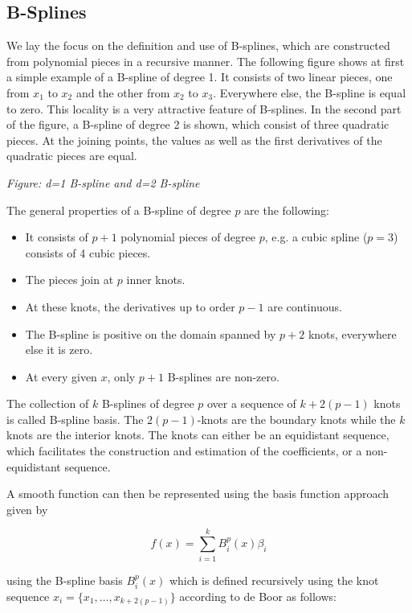 \documentclass[10pt,a4paper]{article}
\begin{document}
\subsection{B-Splines}

We lay the focus on the definition and use of B-splines, which are constructed from polynomial pieces in a recursive manner. The following figure shows at first a simple example of a B-spline of degree 1. It consists of two linear pieces, one from $x_1$ to $x_2$ and the other from $x_2$ to $x_3$. Everywhere else, the B-spline is equal to zero. This locality is a very attractive feature of B-splines. In the second part of the figure, a B-spline of degree 2 is shown, which consist of three quadratic pieces. At the joining points, the values as well as the first derivatives of the quadratic pieces are equal. 

\emph{Figure: d=1 B-spline and d=2 B-spline}

The general properties of a B-spline of degree $p$ are the following:

\begin{itemize}
	\item It consists of $p+1$ polynomial pieces of degree $p$, e.g. a cubic spline ($p=3$) consists of 4 cubic pieces.
	\item The pieces join at $p$ inner knots.
	\item At these knots, the derivatives up to order $p-1$ are continuous.
	\item The B-spline is positive on the domain spanned by $p+2$ knots, everywhere else it is zero.
	\item At every given $x$, only $p+1$ B-splines are non-zero.
\end{itemize}

The collection of $k$ B-splines of degree $p$ over a sequence of $k+2(p-1)$ knots is called B-spline basis. The $2(p-1)$-knots are the boundary knots while the $k$ knots are the interior knots. The knots can either be an equidistant sequence, which facilitates the construction and estimation of the coefficients, or a non-equidistant sequence.

A smooth function can then be represented using the basis function approach given by

$$f(x) = \sum_{i=1}^k B_i^p(x) \beta_i $$

using the B-spline basis $B_i^p(x)$ which is defined recursively using the knot sequence $x_i = \{x_1, \dots, x_{k+2(p-1)}\}$ according to de Boor as follows:
\end{document}

